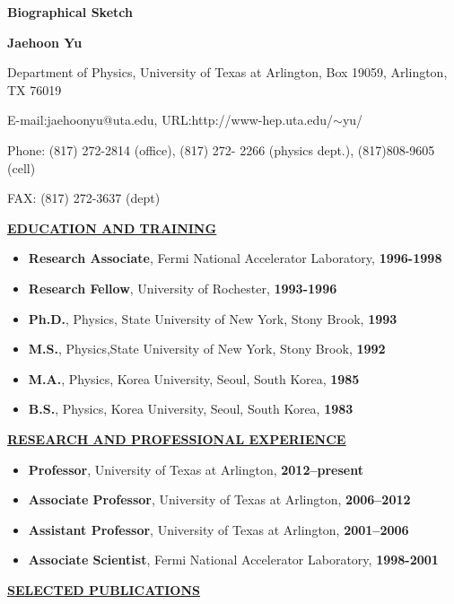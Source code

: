 \begin{center}
\textbf{Biographical Sketch}




{\large \bf Jaehoon Yu}




Department of Physics, University of Texas at Arlington, Box 19059, Arlington, TX 76019

E-mail:jaehoonyu@uta.edu, URL:http://www-hep.uta.edu/$\sim$yu/

Phone: (817) 272-2814 (office), (817) 272- 2266 (physics dept.), (817)808-9605 (cell)

FAX: (817) 272-3637 (dept)

\end{center}
%
{\underline{\underline{{\bf EDUCATION AND TRAINING}}}}
\begin{itemize}[noitemsep]
\item {\bf Research Associate}{, Fermi National Accelerator Laboratory,} {\bf 1996-1998}
\item {\bf Research Fellow}{, University of Rochester,} {\bf 1993-1996}
\item {\bf Ph.D.}{, Physics, State University of New York, Stony Brook, } {\bf 1993}
\item {\bf M.S.}{, Physics,State University of New York, Stony Brook, } {\bf 1992}
\item {\bf M.A.}{, Physics, Korea University, Seoul, South Korea,} {\bf 1985}
\item {\bf B.S.}{, Physics, Korea University, Seoul, South Korea,} {\bf 1983}
\end{itemize}
%
{\underline{\underline{{\bf RESEARCH AND PROFESSIONAL EXPERIENCE}}}}
\begin{itemize}[noitemsep]
\item {\bf Professor}{, University of Texas at Arlington, } {\bf 2012--present}
\item {\bf Associate Professor}{, University of Texas at Arlington, } {\bf 2006--2012}
\item {\bf Assistant Professor}{, University of Texas at Arlington, } {\bf 2001--2006}
\item {\bf Associate Scientist}{, Fermi National Accelerator Laboratory, }{\bf 1998-2001}
\end{itemize}
%
{\underline{\underline{{\bf SELECTED PUBLICATIONS}}}}
